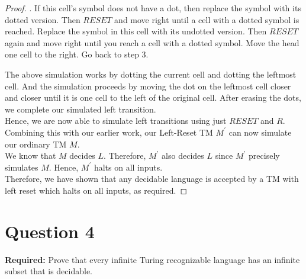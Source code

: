 \documentclass[12pt]{article}
\begin{document}
\begin{proof}
. If this cell's symbol does not have a dot, then replace the symbol with its dotted version. Then $RESET$ and move right until a cell with a dotted symbol is reached. Replace the symbol in this cell with its undotted version. Then $RESET$ again and move right until you reach a cell with a dotted symbol. Move the head one cell to the right. Go back to step 3. \\

\setlength\parindent{0pt}

The above simulation works by dotting the current cell and dotting the leftmost cell. And the simulation proceeds by moving the dot on the leftmost cell closer and closer until it is one cell to the left of the original cell. After erasing the dots, we complete our simulated left transition. \\

Hence, we are now able to simulate left transitions using just $RESET$ and $R$. Combining this with our earlier work, our Left-Reset TM $M^\prime$ can now simulate our ordinary TM $M$. \\

We know that $M$ decides $L$. Therefore, $M^\prime$ also decides $L$ since $M^\prime$ precisely simulates $M$. Hence, $M^\prime$ halts on all inputs. \\

Therefore, we have shown that any decidable language is accepted by a TM with left reset which halts on all inputs, as required. 
\end{proof}


\newpage

\section*{Question 4}

\textbf{Required:} Prove that every infinite Turing recognizable language has an infinite subset that is decidable. 
\end{document}
